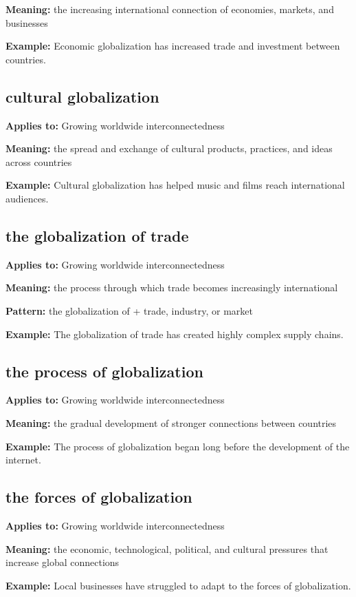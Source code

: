 \documentclass[11pt]{article}
\begin{document}
\textbf{Meaning:} the increasing international connection of economies, markets, and businesses

\textbf{Example:} Economic globalization has increased trade and investment between countries.

\subsection{cultural globalization}
\textbf{Applies to:} Growing worldwide interconnectedness

\textbf{Meaning:} the spread and exchange of cultural products, practices, and ideas across countries

\textbf{Example:} Cultural globalization has helped music and films reach international audiences.

\subsection{the globalization of trade}
\textbf{Applies to:} Growing worldwide interconnectedness

\textbf{Meaning:} the process through which trade becomes increasingly international

\textbf{Pattern:} the globalization of + trade, industry, or market

\textbf{Example:} The globalization of trade has created highly complex supply chains.

\subsection{the process of globalization}
\textbf{Applies to:} Growing worldwide interconnectedness

\textbf{Meaning:} the gradual development of stronger connections between countries

\textbf{Example:} The process of globalization began long before the development of the internet.

\subsection{the forces of globalization}
\textbf{Applies to:} Growing worldwide interconnectedness

\textbf{Meaning:} the economic, technological, political, and cultural pressures that increase global connections

\textbf{Example:} Local businesses have struggled to adapt to the forces of globalization.
\end{document}
